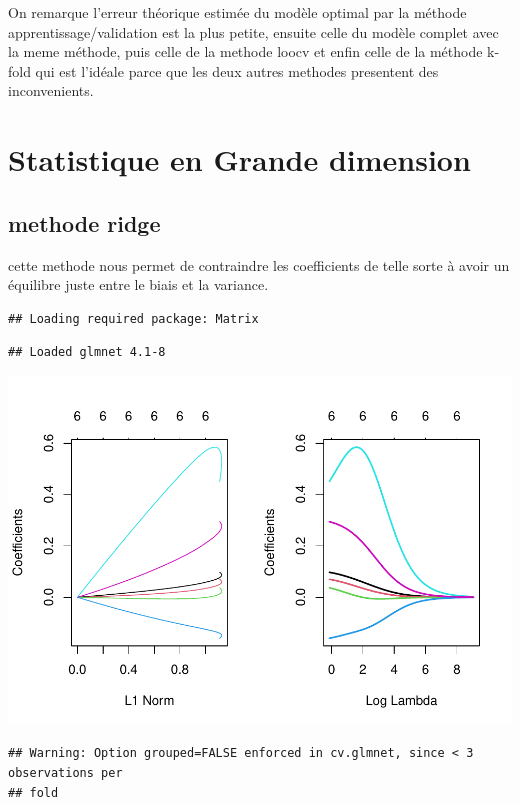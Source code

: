 \documentclass[
  12pt,
]{article}
\begin{document}
On remarque l'erreur théorique estimée du modèle optimal par la méthode
apprentissage/validation est la plus petite, ensuite celle du modèle
complet avec la meme méthode, puis celle de la methode loocv et enfin
celle de la méthode k-fold qui est l'idéale parce que les deux autres
methodes presentent des inconvenients.

\section{Statistique en Grande
dimension}\label{statistique-en-grande-dimension}

\subsection{methode ridge}\label{methode-ridge}

cette methode nous permet de contraindre les coefficients de telle sorte
à avoir un équilibre juste entre le biais et la variance.

\begin{verbatim}
## Loading required package: Matrix
\end{verbatim}

\begin{verbatim}
## Loaded glmnet 4.1-8
\end{verbatim}

\includegraphics{rmd_final_files/figure-latex/unnamed-chunk-53-1.pdf}

\begin{verbatim}
## Warning: Option grouped=FALSE enforced in cv.glmnet, since < 3 observations per
## fold
\end{verbatim}
\end{document}

